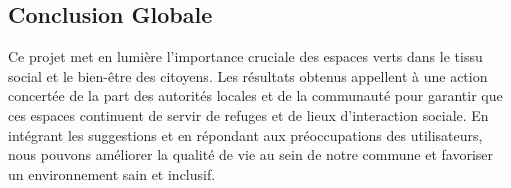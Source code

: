 \documentclass[
]{article}
\begin{document}
\subsection{Conclusion Globale}\label{conclusion-globale}

Ce projet met en lumière l'importance cruciale des espaces verts dans le
tissu social et le bien-être des citoyens. Les résultats obtenus
appellent à une action concertée de la part des autorités locales et de
la communauté pour garantir que ces espaces continuent de servir de
refuges et de lieux d'interaction sociale. En intégrant les suggestions
et en répondant aux préoccupations des utilisateurs, nous pouvons
améliorer la qualité de vie au sein de notre commune et favoriser un
environnement sain et inclusif.
\end{document}
